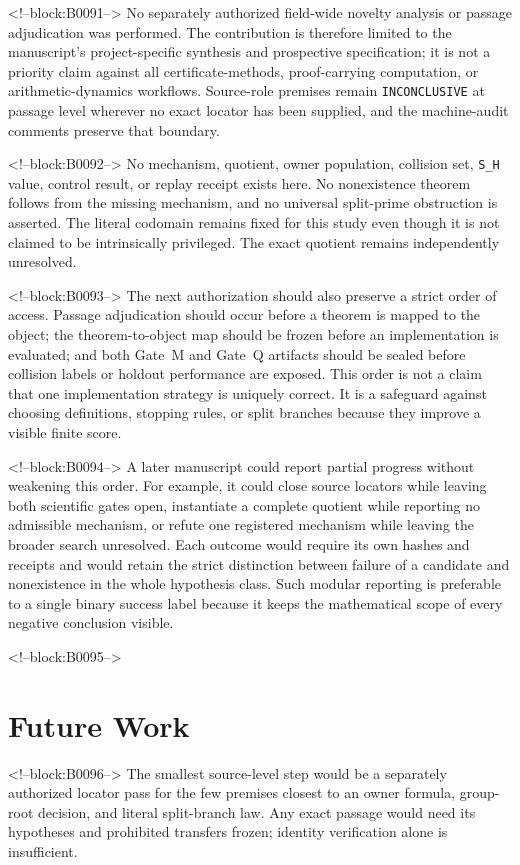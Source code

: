 \documentclass[11pt,a4paper]{article}
\begin{document}
<!--block:B0091-->
No separately authorized field-wide novelty analysis or passage adjudication was performed. The contribution is therefore limited to the manuscript's project-specific synthesis and prospective specification; it is not a priority claim against all certificate-methods, proof-carrying computation, or arithmetic-dynamics workflows. Source-role premises remain \texttt{INCONCLUSIVE} at passage level wherever no exact locator has been supplied, and the machine-audit comments preserve that boundary.

<!--block:B0092-->
No mechanism, quotient, owner population, collision set, \texttt{S\_H} value, control result, or replay receipt exists here. No nonexistence theorem follows from the missing mechanism, and no universal split-prime obstruction is asserted. The literal codomain remains fixed for this study even though it is not claimed to be intrinsically privileged. The exact quotient remains independently unresolved.

<!--block:B0093-->
The next authorization should also preserve a strict order of access. Passage adjudication should occur before a theorem is mapped to the object; the theorem-to-object map should be frozen before an implementation is evaluated; and both Gate~M and Gate~Q artifacts should be sealed before collision labels or holdout performance are exposed. This order is not a claim that one implementation strategy is uniquely correct. It is a safeguard against choosing definitions, stopping rules, or split branches because they improve a visible finite score.

<!--block:B0094-->
A later manuscript could report partial progress without weakening this order. For example, it could close source locators while leaving both scientific gates open, instantiate a complete quotient while reporting no admissible mechanism, or refute one registered mechanism while leaving the broader search unresolved. Each outcome would require its own hashes and receipts and would retain the strict distinction between failure of a candidate and nonexistence in the whole hypothesis class. Such modular reporting is preferable to a single binary success label because it keeps the mathematical scope of every negative conclusion visible.

<!--block:B0095-->
\section{Future Work}

<!--block:B0096-->
The smallest source-level step would be a separately authorized locator pass for the few premises closest to an owner formula, group-root decision, and literal split-branch law. Any exact passage would need its hypotheses and prohibited transfers frozen; identity verification alone is insufficient.
\end{document}
